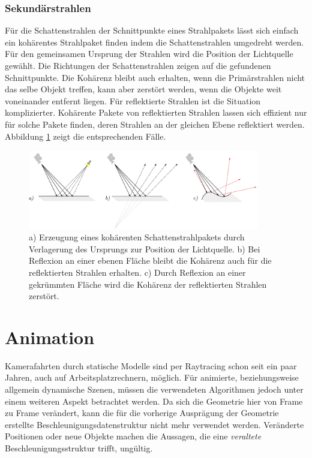 \subsection{Sekundärstrahlen}

Für die Schattenstrahlen der Schnittpunkte eines Strahlpakets lässt sich einfach ein kohärentes Strahlpaket finden indem die Schattenstrahlen umgedreht werden. Für den gemeinsamen Ursprung der Strahlen wird die Position der Lichtquelle gewählt. Die Richtungen der Schattenstrahlen zeigen auf die gefundenen Schnittpunkte. Die Kohärenz bleibt auch erhalten, wenn die Primärstrahlen nicht das selbe Objekt treffen, kann aber zerstört werden, wenn die Objekte weit voneinander entfernt liegen.
Für reflektierte Strahlen ist die Situation komplizierter. Kohärente Pakete von reflektierten Strahlen lassen sich effizient nur für solche Pakete finden, deren Strahlen an der gleichen Ebene reflektiert werden. Abbildung \ref{fig:secondaryrays} zeigt die entsprechenden Fälle.\citep{DHS04}
\begin{figure}\centering
\includegraphics[width=0.9\textwidth]{images/secondaryrays.pdf} 
\caption[Kohärenz bei Sekundärstrahlen]{a) Erzeugung eines kohärenten Schattenstrahlpakets durch Verlagerung des Ursprungs zur Position der Lichtquelle. b) Bei Reflexion an einer ebenen Fläche bleibt die Kohärenz auch für die reflektierten Strahlen erhalten. c) Durch Reflexion an einer gekrümmten Fläche wird die Kohärenz der reflektierten Strahlen zerstört.}
\label{fig:secondaryrays}
\end{figure}

\chapter{Animation}

Kamerafahrten durch statische Modelle sind per Raytracing schon seit ein paar Jahren, auch auf Arbeitsplatzrechnern, möglich. Für animierte, beziehungsweise allgemein dynamische Szenen, müssen die verwendeten Algorithmen jedoch unter einem weiteren Aspekt betrachtet werden. Da sich die Geometrie hier von Frame zu Frame verändert, kann die für die vorherige Ausprägung der Geometrie erstellte Beschleunigungsdatenstruktur nicht mehr verwendet werden. Veränderte Positionen oder neue Objekte machen die Aussagen, die eine \textit{veraltete} Beschleunigungsstruktur trifft, ungültig.

